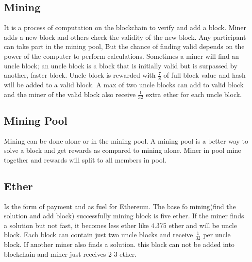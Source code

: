 \subsection{Mining}
It is a process of computation on the blockchain to verify and add a block. Miner adds a new block and others check the validity of the new block. Any participant can take part in the mining pool, But the chance of finding valid depends on the power of the computer to perform calculations. Sometimes a miner will find an uncle block; an uncle block is a block that is initially valid but is surpassed by another, faster block. Uncle block is rewarded with $\frac{7}{8}$ of full block value and hash will be added to a valid block. A max of two uncle blocks can add to valid block and the miner of the valid block also receive $\frac{1}{32}$ extra ether for each uncle block\cite{Egbertsen}.
\subsection{Mining Pool} Mining can be done alone or in the mining pool. A mining pool is a better way to solve a block and get rewards as compared to mining alone. Miner in pool mine together and rewards will split to all members in pool\cite{Egbertsen}.
\subsection{Ether} Is the form of payment and as fuel for Ethereum. The base fo mining(find the solution and add block) successfully mining block is five ether. If the miner finds a solution but not fast, it becomes less ether like 4.375 ether and will be uncle block. Each block can contain just two uncle blocks and receive $\frac{1}{32}$ per uncle block. If another miner also finds a solution. this block can not be added into blockchain and miner just receives 2-3 ether\cite{Egbertsen}.


